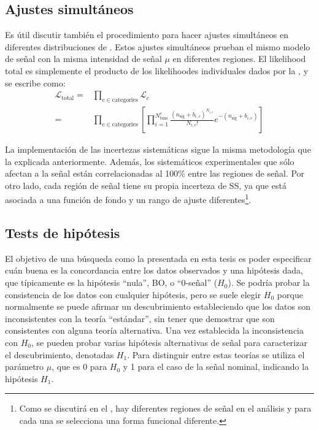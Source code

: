\subsection{Ajustes simult\'aneos}
\label{subsec:strategy:stat_treatment:simult_fits}

Es útil discutir también el procedimiento para hacer ajustes simultáneos en diferentes distribuciones de \myj. Estos ajustes simultáneos prueban el mismo modelo de señal con la misma intensidad de señal \(\mu\) en diferentes regiones. El likelihood total es simplemente el producto de los likelihoodes individuales dados por la \Eqn{\ref{eq:strategy:stat_treatment:stat_model:likelihood}}, y se escribe como:
\begin{align}
    \mathcal{L}_{\text{total}} =& \prod_{c\in \text{categories}} \mathcal{L}_c\\
    =& \prod_{c\in \text{categories}} \left[
        \prod_{i=1}^{N^c_{\text{bins}}} \frac{\left( n_{\text{sig}} + b_{i, c} \right)^{N_{i, c}}}{N_{i, c} !} e^{-\left( n_{\text{sig}} + b_{i, c} \right)}
    \right]
\end{align}

La implementación de las incertezas sistemáticas sigue la misma metodolog\'ia que la explicada anteriormente. Adem\'as, los sistemáticos experimentales que sólo afectan a la señal están correlacionadas al 100\% entre las regiones de señal. Por otro lado, cada región de señal tiene su propia incerteza de \ac{SS}, ya que está asociada a una función de fondo y un rango de ajuste diferentes\footnote{Como se discutir\'a en el \Ch{\ref{ch:bkg}}, hay diferentes regiones de señal en el análisis y para cada una se selecciona una forma funcional diferente.}.








\subsection{Tests de hip\'otesis}
\label{subsec:strategy:stat_treatment:hypo_test}

El objetivo de una búsqueda como la presentada en esta tesis es poder especificar cu\'an buena es la concordancia entre los datos observados y una hipótesis dada, que típicamente es la hipótesis \enquote{nula}, \ac{BO}, o \enquote{0-se\~nal} (\(H_0\)). Se podría probar la consistencia de los datos con cualquier hipótesis, pero se suele elegir \(H_0\) porque normalmente se puede afirmar un descubrimiento estableciendo que los datos son inconsistentes con la teoría \enquote{est\'andar}, sin tener que demostrar que son consistentes con alguna teoría alternativa. Una vez establecida la inconsistencia con \(H_0\), se pueden probar varias hipótesis alternativas de señal para caracterizar el descubrimiento, denotadas \(H_1\). Para distinguir entre estas teorías se utiliza el parámetro \(\mu\), que es 0 para \(H_0\) y 1 para el caso de la señal nominal, indicando la hip\'otesis \(H_1\).

